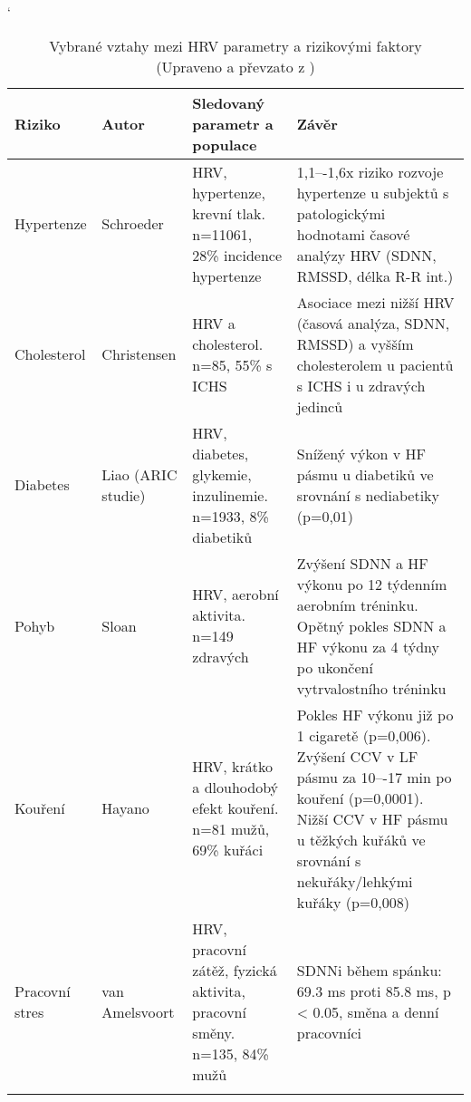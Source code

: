 \begin{table}[h]
	\captionsetup{skip=0.5pt}
	\catcode`
	\scriptsize
	\begin{center}
		\caption[HRV a rizikové faktory]{Vybrané vztahy mezi HRV parametry a
			rizikovými faktory \\ (Upraveno a převzato z \cite{Pumprla2014,Thayer2009})}
		\label{tab:hrv_factors}
		\vspace{1ex}
		\renewcommand{\arraystretch}{1.3}
		\begin{tabular}{|p{1.3cm}|p{1.7cm}|p{4.5cm}|p{5.5cm}|}
			\noalign{\hrule height 2pt}
			\textbf{Riziko} & \textbf{Autor}     & \textbf{Sledovaný parametr a populace}                                  & \textbf{Závěr}                                                                                                                                                                                  \\ \hline
			Hypertenze      & Schroeder          & HRV, hypertenze, krevní tlak. n=11061, 28\% incidence hypertenze        & 1,1–-1,6x riziko rozvoje hypertenze u subjektů s patologickými hodnotami časové analýzy HRV (SDNN, RMSSD, délka R-R int.)                                                                       \\ \hline
			Cholesterol     & Christensen        & HRV a cholesterol. n=85, 55\% s ICHS                                    & Asociace mezi nižší HRV (časová analýza, SDNN, RMSSD) a vyšším cholesterolem u pacientů s ICHS i u zdravých jedinců                                                                             \\ \hline
			Diabetes        & Liao (ARIC studie) & HRV, diabetes, glykemie, inzulinemie. n=1933, 8\% diabetiků             & Snížený výkon v HF pásmu u diabetiků ve srovnání s nediabetiky (p=0,01)                                                                                                                         \\ \hline
			Pohyb           & Sloan              & HRV, aerobní aktivita. n=149 zdravých                                   & Zvýšení SDNN a HF výkonu po 12 týdenním aerobním tréninku. Opětný pokles SDNN a HF výkonu za 4 týdny po ukončení vytrvalostního tréninku                                                        \\ \hline
			Kouření         & Hayano             & HRV, krátko a dlouhodobý efekt kouření. n=81 mužů, 69\% kuřáci          & Pokles HF výkonu již po 1 cigaretě (p=0,006). Zvýšení CCV v LF pásmu za 10–-17 min po kouření (p=0,0001). Nižší CCV v HF pásmu u těžkých kuřáků ve srovnání s nekuřáky/lehkými kuřáky (p=0,008) \\ \hline
			Pracovní stres  & van Amelsvoort     & HRV, pracovní zátěž, fyzická aktivita, pracovní směny. n=135, 84\% mužů & SDNNi během spánku: 69.3 ms proti 85.8 ms, p < 0.05, směna a denní pracovníci                                                                                                                   \\ \noalign{\hrule height 2pt}
		\end{tabular}
	\end{center}
\end{table}